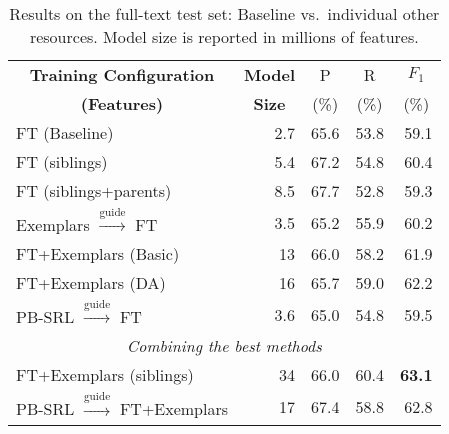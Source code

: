 
\setlength\tabcolsep{4pt}

\begin{table}\centering\small
\def\arraystretch{1}
\begin{tabular}{lr<{\hspace*{5pt}}rrr}%
\toprule
\multicolumn{1}{c}{\textbf{Training Configuration}} 
& \multicolumn{1}{c}{\textbf{Model}} &  \multicolumn{1}{c}{P} &
\multicolumn{1}{c}{R} 
&  \multicolumn{1}{c}{$F_1$} \\
 \multicolumn{1}{c}{\textbf{(Features)}} 
& \multicolumn{1}{c}{\textbf{Size}} 
&  \multicolumn{1}{c}{(\%)} &  \multicolumn{1}{c}{(\%)} &  \multicolumn{1}{c}{(\%)}\\
\midrule
FT (Baseline) & 2.7 & 65.6 & 53.8 & 59.1 \\ %
\midrule
FT (siblings) & 5.4 & 67.2 & 54.8 & 60.4 \\
FT (siblings+parents) & 8.5 & 67.7 & 52.8 & 59.3 \\
\midrule
Exemplars $\xrightarrow{\text{guide}}$ FT & 3.5 & 65.2 & 55.9 & 60.2 \\
FT+Exemplars (Basic) & 13\nss{.?} & 66.0 & 58.2 & 61.9 \\
FT+Exemplars (DA) & 16\nss{.?} & 65.7 & 59.0 & 62.2 \\
\midrule
PB-SRL $\xrightarrow{\text{guide}}$ FT & 3.6 & 65.0 & 54.8 & 59.5 \\
\midrule
\multicolumn{5}{c}{\em{Combining the best methods}}\\
\midrule
FT+Exemplars (siblings) & 34 & 66.0 & 60.4 & \textbf{63.1} \\
PB-SRL $\xrightarrow{\text{guide}}$ FT+Exemplars & 17 & 67.4 & 58.8 & 62.8 \\
\bottomrule
\end{tabular}
\caption{Results on the full-text test set:
Baseline vs.~individual other resources.  Model size is reported in
millions of features.
\label{tbl:results}}
\end{table}

